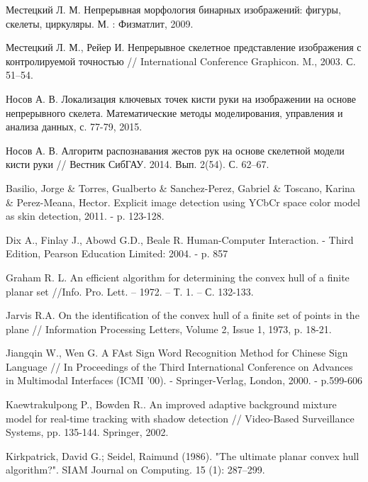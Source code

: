 \newpage
\begin{thebibliography}{99}                    %

Местецкий Л. М. Непрерывная морфология бинарных изображений: фигуры,
скелеты, циркуляры. М. : Физматлит, 2009.

Местецкий Л. М., Рейер И. Непрерывное скелетное представление 
изображения с контролируемой точностью // International Conference
Graphicon. M., 2003. С. 51–54.

Носов А. В. Локализация ключевых точек кисти руки на изображении на
основе непрерывного скелета. Математические методы моделирования,
управления и анализа данных, с. 77-79, 2015.

Носов А. В. Алгоритм распознавания жестов
рук на основе скелетной модели кисти руки // Вестник
СибГАУ. 2014. Вып. 2(54). С. 62–67.

Basilio, Jorge \& Torres, Gualberto \& Sanchez-Perez, Gabriel \& Toscano,
Karina \& Perez-Meana, Hector. Explicit image detection using
YCbCr space color model as skin detection, 2011. - p. 123-128. 

Dix A., Finlay J., Abowd G.D., Beale R. Human-Computer Interaction. - Third Edition, Pearson
Education Limited: 2004. - p. 857

Graham R. L. An efficient algorithm for determining the
convex hull of a finite planar set //Info. Pro. Lett. –
1972. – Т. 1. – С. 132-133.

Jarvis R.A. On the identification of the convex hull of a finite set of
points in the plane // Information Processing Letters, Volume 2,
Issue 1, 1973, p. 18-21.

Jiangqin W., Wen G. A FAst Sign Word Recognition Method for Chinese Sign Language // In 
Proceedings of the Third International Conference on Advances in Multimodal Interfaces (ICMI 
'00). - Springer-Verlag, London, 2000. - p.599-606

Kaewtrakulpong P., Bowden R.. An improved adaptive 
background mixture model for real-time tracking with
shadow detection // Video-Based Surveillance Systems, pp.
135-144. Springer, 2002.

Kirkpatrick, David G.; Seidel, Raimund (1986). "The ultimate planar
convex hull algorithm?". SIAM Journal on Computing. 15 (1): 287–299.


\end{thebibliography}
